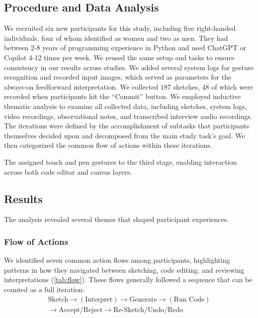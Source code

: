\subsection{Procedure and Data Analysis}
We recruited six new participants for this study, including five right-handed individuals, four of whom identified as women and two as men. They had between 2-8 years of programming experience in Python and used ChatGPT or Copilot 4-12 times per week. We reused the same setup and tasks to ensure consistency in our results across studies. We added several system logs for gesture recognition and recorded input images, which served as parameters for the always-on feedforward interpretation. We collected $187$ sketches, $48$ of which were recorded when participants hit the ``Commit'' button.
We employed inductive thematic analysis to examine all collected data, including sketches, system logs, video recordings, observational notes, and transcribed interview audio recordings. The iterations were defined by the accomplishment of subtasks that participants themselves decided upon and decomposed from the main study task's goal. We then categorized the common flow of actions within these iterations.



\begin{table*}[bt]
    \caption{The assigned touch and pen gestures to the third stage, enabling interaction across both code editor and canvas layers.}
    
    \label{tab:gestures}
\end{table*}



\subsection{Results}
The analysis revealed several themes that shaped participant experiences.

\subsubsection{Flow of Actions}
We identified seven common action flows among participants, highlighting patterns in how they navigated between sketching, code editing, and reviewing interpretations (\autoref{tab:flow}). These flows generally followed a sequence that can be counted as a full iteration:
\[
\begin{array}{c}
\text{Sketch} \rightarrow (\text{Interpret}) \rightarrow \text{Generate} \rightarrow (\text{Run Code}) \\
\rightarrow \text{Accept/Reject}
\rightarrow \text{Re-Sketch/Undo/Redo}
\end{array}
\]

